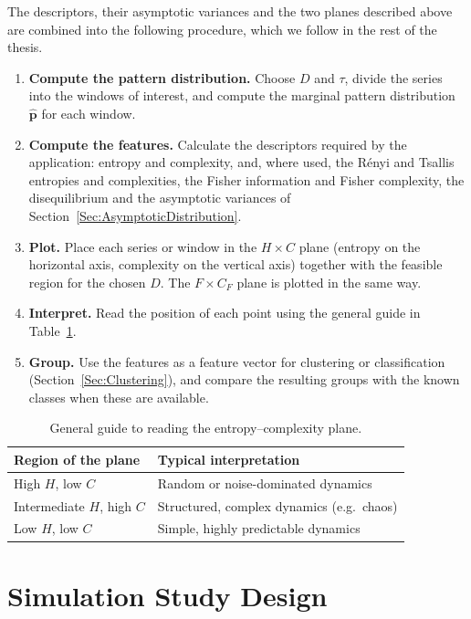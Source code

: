 The descriptors, their asymptotic variances and the two planes described above are combined into the following procedure, which we follow in the rest of the thesis.
\begin{enumerate}
	\item \textbf{Compute the pattern distribution.} Choose $D$ and $\tau$, divide the series into the windows of interest, and compute the marginal pattern distribution $\widehat{\mathbf{p}}$ for each window.
	\item \textbf{Compute the features.} Calculate the descriptors required by the application: entropy and complexity, and, where used, the Rényi and Tsallis entropies and complexities, the Fisher information and Fisher complexity, the disequilibrium and the asymptotic variances of Section~\ref{Sec:AsymptoticDistribution}.
	\item \textbf{Plot.} Place each series or window in the $H\times C$ plane (entropy on the horizontal axis, complexity on the vertical axis) together with the feasible region for the chosen $D$. The $F\times C_F$ plane is plotted in the same way.
	\item \textbf{Interpret.} Read the position of each point using the general guide in Table~\ref{tab:PlaneInterpretation}.
	\item \textbf{Group.} Use the features as a feature vector for clustering or classification (Section~\ref{Sec:Clustering}), and compare the resulting groups with the known classes when these are available.
\end{enumerate}

\begin{table}[H]
	\centering
	\begin{tabular}{ll}
		\toprule
		Region of the plane & Typical interpretation \\
		\midrule
		High $H$, low $C$ & Random or noise-dominated dynamics \\
		Intermediate $H$, high $C$ & Structured, complex dynamics (e.g.\ chaos) \\
		Low $H$, low $C$ & Simple, highly predictable dynamics \\
		\bottomrule
	\end{tabular}
	\caption{General guide to reading the entropy--complexity plane.}
	\label{tab:PlaneInterpretation}
\end{table}

\section{Simulation Study Design}\label{Sec:Simulation}

